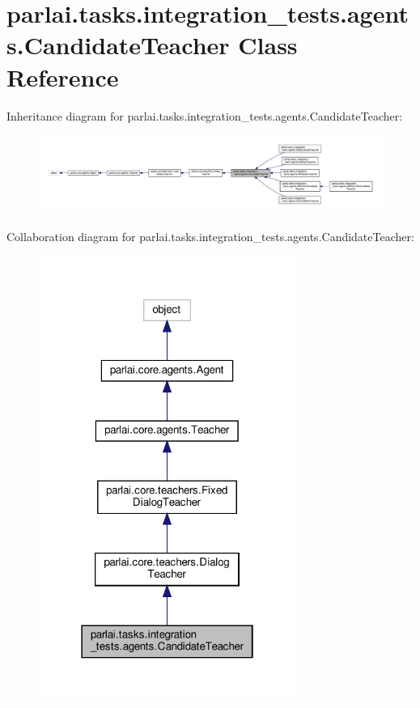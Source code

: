 \hypertarget{classparlai_1_1tasks_1_1integration__tests_1_1agents_1_1CandidateTeacher}{}\section{parlai.\+tasks.\+integration\+\_\+tests.\+agents.\+Candidate\+Teacher Class Reference}
\label{classparlai_1_1tasks_1_1integration__tests_1_1agents_1_1CandidateTeacher}


Inheritance diagram for parlai.\+tasks.\+integration\+\_\+tests.\+agents.\+Candidate\+Teacher\+:
\nopagebreak
\begin{figure}[H]
\begin{center}
\leavevmode
\includegraphics[width=350pt]{classparlai_1_1tasks_1_1integration__tests_1_1agents_1_1CandidateTeacher__inherit__graph}
\end{center}
\end{figure}


Collaboration diagram for parlai.\+tasks.\+integration\+\_\+tests.\+agents.\+Candidate\+Teacher\+:
\nopagebreak
\begin{figure}[H]
\begin{center}
\leavevmode
\includegraphics[width=238pt]{classparlai_1_1tasks_1_1integration__tests_1_1agents_1_1CandidateTeacher__coll__graph}
\end{center}
\end{figure}
